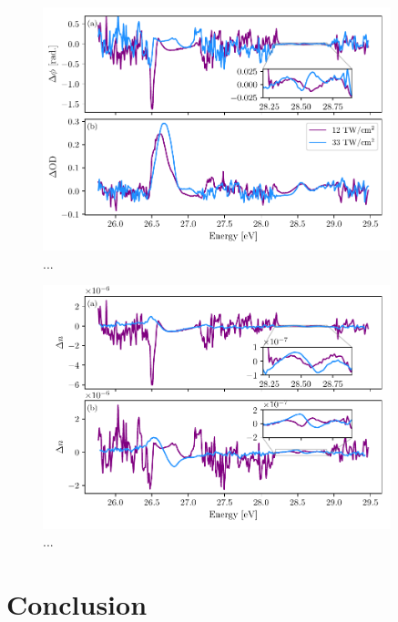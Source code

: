 \begin{figure}
	\centering
	\includegraphics[width=0.9\textwidth]{figures/CATS/dphi_dod_lineout.pdf}
	\caption[...]{...}
	\label{fig:dphi_dod_lineout}
\end{figure}

\begin{figure}
	\centering
	\includegraphics[width=0.9\textwidth]{figures/CATS/dn_kk_lineout.pdf}
	\caption[...]{...}
	\label{fig:dn_kk_lineout}
\end{figure}


\section{Conclusion}
\label{sec:CATS_conclusion}